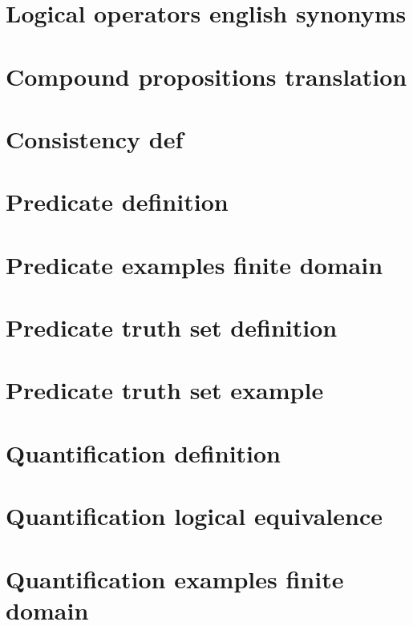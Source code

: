 \section*{Logical operators english synonyms}

\vfill
\section*{Compound propositions translation}

\vfill
\section*{Consistency def}

\vfill
\section*{Predicate definition}

\vfill
\section*{Predicate examples finite domain}

\vfill
\section*{Predicate truth set definition}

\vfill
\section*{Predicate truth set example}

\vfill
\section*{Quantification definition}

\vfill
\section*{Quantification logical equivalence}

\vfill
\section*{Quantification examples finite domain}

\vfill
